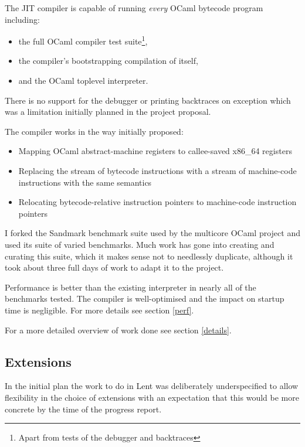 \documentclass[12pt,a4paper, headings=standardclasses, parskip=on]{scrartcl}
\begin{document}
The JIT compiler is capable of running \emph{every} OCaml bytecode program including:

\begin{itemize}
      \item the full OCaml compiler test suite\footnote{Apart from tests of the debugger and backtraces},
      \item the compiler's bootstrapping compilation of itself,
      \item and the OCaml toplevel interpreter.
\end{itemize}


There is no support for the debugger or printing backtraces on exception which was a limitation
initially planned in the project proposal.

The compiler works in the way initially proposed:

\begin{itemize}
      \item Mapping OCaml abstract-machine registers to callee-saved x86\_64 registers
      \item Replacing the stream of bytecode instructions with a stream of machine-code instructions
            with the same semantics
      \item Relocating bytecode-relative instruction pointers to machine-code instruction pointers
\end{itemize}

I forked the Sandmark benchmark suite used by the multicore OCaml project and
used its suite of varied benchmarks. Much work has gone into creating and
curating this suite, which it makes sense not to needlessly duplicate, although it took
about three full days of work to adapt it to the project.

Performance is better than the existing interpreter in nearly all of the
benchmarks tested. The compiler is well-optimised and the impact on startup
time is negligible. For more details see section \ref{perf}.

For a more detailed overview of work done see section \ref{details}.

\subsection{Extensions}

In the initial plan the work to do in Lent was deliberately underspecified to allow flexibility
in the choice of extensions with an expectation that this would be more concrete by the time of the
progress report.
\end{document}
